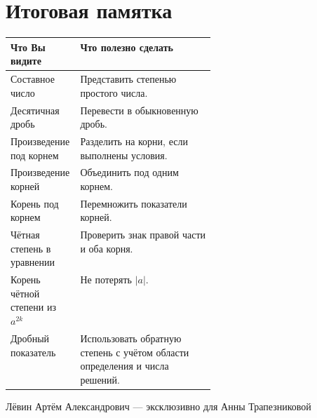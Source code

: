 \documentclass[a4paper,12pt]{article}
\begin{document}
\section*{Итоговая памятка}
\begin{tabularx}{\linewidth}{@{}p{0.34\linewidth}X@{}}
\toprule
\textbf{Что Вы видите} & \textbf{Что полезно сделать}\\
\midrule
Составное число & Представить степенью простого числа.\\
Десятичная дробь & Перевести в обыкновенную дробь.\\
Произведение под корнем & Разделить на корни, если выполнены условия.\\
Произведение корней & Объединить под одним корнем.\\
Корень под корнем & Перемножить показатели корней.\\
Чётная степень в уравнении & Проверить знак правой части и оба корня.\\
Корень чётной степени из $a^{2k}$ & Не потерять $|a|$.\\
Дробный показатель & Использовать обратную степень с учётом области определения и числа решений.\\
\bottomrule
\end{tabularx}
\vfill
\begin{center}
{\small\color{muted}Лёвин Артём Александрович --- эксклюзивно для Анны Трапезниковой}
\end{center}
\end{document}
